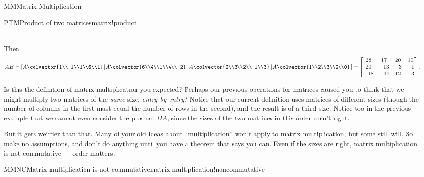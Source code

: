 \begin{subsect}{MM}{Matrix Multiplication}
\begin{example}{PTM}{Product of two matrices}{matrix!product}
\begin{para}
\begin{align*}
\end{align*}
\end{para}
%
\begin{para}Then
%
\begin{equation*}
AB=
\left[
A\colvector{1\\-1\\1\\6\\1}
\left\lvert A\colvector{6\\4\\1\\4\\-2}\right.
\left\lvert A\colvector{2\\3\\2\\-1\\3}\right.
\left\lvert A\colvector{1\\2\\3\\2\\0}\right.
\right]
=
\begin{bmatrix}
28 & 17 & 20 & 10\\
20 & -13 & -3 & -1\\
-18 & -44 & 12 & -3
\end{bmatrix}.
\end{equation*}
\end{para}
%
\end{example}
%
\begin{para}Is this the definition of matrix multiplication you expected?  Perhaps our previous operations for matrices caused you to think that we might multiply two matrices of the {\em same} size, {\em entry-by-entry}?  Notice that our current definition uses matrices of different sizes (though the number of columns in the first must equal the number of rows in the second), and the result is of a third size.  Notice too in the previous example that we cannot even consider the product $BA$, since the sizes of the two matrices in this order aren't right.\end{para}
%
\begin{para}But it gets weirder than that.  Many of your old ideas about ``multiplication'' won't apply to matrix multiplication, but some still will.  So make no assumptions, and don't do anything until you have a theorem that says you can.  Even if the sizes are right, matrix multiplication is not commutative --- order matters.\end{para}
%
\begin{example}{MMNC}{Matrix multiplication is not commutative}{matrix multiplication!noncommutative}

\end{example}
\end{subsect}
